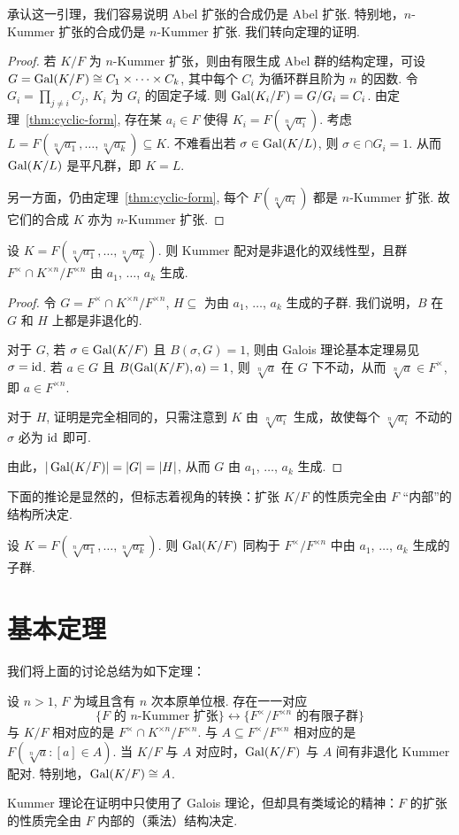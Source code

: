 承认这一引理，我们容易说明 Abel 扩张的合成仍是 Abel 扩张.  特别地，$n$-Kummer 扩张的合成仍是 $n$-Kummer 扩张.  我们转向定理的证明.
\begin{proof}
  若 $K/F$ 为 $n$-Kummer 扩张，则由有限生成 Abel 群的结构定理，可设 $G = \operatorname{Gal}(K/F) \cong C_1 \times \cdots \times C_k$, 其中每个 $C_i$ 为循环群且阶为 $n$ 的因数.  令 $G_i = \prod_{j \ne i} C_j$, $K_i$ 为 $G_i$ 的固定子域.  则 $\operatorname{Gal}(K_i/F) = G/G_i = C_i$.  由定理~\ref{thm:cyclic-form}, 存在某 $a_i \in F$ 使得 $K_i = F(\sqrt[n]{a_i})$.  考虑 $L = F(\sqrt[n]{a_1}, \ldots, \sqrt[n]{a_k}) \subseteq K$.  不难看出若 $\sigma \in \operatorname{Gal}(K/L)$, 则 $\sigma \in \cap G_i = 1$.  从而 $\operatorname{Gal}(K/L)$ 是平凡群，即 $K = L$.

  另一方面，仍由定理~\ref{thm:cyclic-form}, 每个 $F(\sqrt[n]{a_i})$ 都是 $n$-Kummer 扩张.  故它们的合成 $K$ 亦为 $n$-Kummer 扩张.
\end{proof}

\begin{thm}
  设 $K = F(\sqrt[n]{a_1}, \ldots, \sqrt[n]{a_k})$.  则 Kummer 配对是非退化的双线性型，且群 $F^\times \cap K^{\times n} / F^{\times n}$ 由 $a_1$, $\ldots$, $a_k$ 生成.
\end{thm}
\begin{proof}
  令 $G = F^\times \cap K^{\times n} / F^{\times n}$, $H \subseteq $ 为由 $a_1$, $\ldots$, $a_k$ 生成的子群.  我们说明，$B$ 在 $G$ 和 $H$ 上都是非退化的.

  对于 $G$, 若 $\sigma \in \operatorname{Gal}(K/F)$ 且 $B(\sigma, G) = 1$, 则由 Galois 理论基本定理易见 $\sigma = \operatorname{id}$.  若 $a \in G$ 且 $B(\operatorname{Gal}(K/F), a) = 1$, 则 $\sqrt[n]{a}$ 在 $G$ 下不动，从而 $\sqrt[n]{a} \in F^\times$, 即 $a \in F^{\times n}$.

  对于 $H$, 证明是完全相同的，只需注意到 $K$ 由 $\sqrt[n]{a_i}$ 生成，故使每个 $\sqrt[n]{a_i}$ 不动的 $\sigma$ 必为 $\operatorname{id}$ 即可.

  由此，$|\operatorname{Gal}(K/F)| = |G| = |H|$, 从而 $G$ 由 $a_1$, $\ldots$, $a_k$ 生成.
\end{proof}
下面的推论是显然的，但标志着视角的转换：扩张 $K/F$ 的性质完全由 $F$ “内部”的结构所决定.
\begin{cor}
  设 $K = F(\sqrt[n]{a_1}, \ldots, \sqrt[n]{a_k})$.  则 $\operatorname{Gal}(K/F)$ 同构于 $F^\times / F^{\times n}$ 中由 $a_1$, $\ldots$, $a_k$ 生成的子群.
\end{cor}

\section{基本定理}
我们将上面的讨论总结为如下定理：
\begin{thm}
  设 $n > 1$, $F$ 为域且含有 $n$ 次本原单位根.  存在一一对应
  \[ \{ F \text{ 的\ } n \text{-Kummer 扩张} \} \leftrightarrow \{F^\times / F^{\times n} \text{ 的有限子群}\} \]
  与 $K/F$ 相对应的是 $F^\times \cap K^{\times n} / F^{\times n}$.  与 $A \subseteq F^\times / F^{\times n}$ 相对应的是 $F(\sqrt[n]{a} \colon [a] \in A)$.  当 $K/F$ 与 $A$ 对应时，$\operatorname{Gal}(K/F)$ 与 $A$ 间有非退化 Kummer 配对.  特别地，$\operatorname{Gal}(K/F) \cong A$.
\end{thm}

Kummer 理论在证明中只使用了 Galois 理论，但却具有类域论的精神：$F$ 的扩张的性质完全由 $F$ 内部的（乘法）结构决定.
